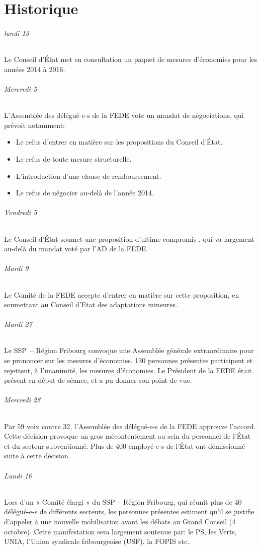 
\chapter{Historique}%
\subparagraph{lundi 13}%
Le Conseil d'État met en consultation un paquet de mesures d'économies pour les années 2014 à 2016.

\subparagraph{Mercredi 5}%
L'Assemblée des délégué-e-s de la FEDE vote un mandat de négociations, qui prévoit notamment:
\begin{itemize}
	\item Le refus d'entrer en matière sur les propositions du Conseil d'État.
	\item Le refus de toute mesure structurelle.
	\item L'introduction d'une clause de remboursement.
	\item Le refus de négocier au-delà de l'année 2014.
\end{itemize}

\subparagraph{Vendredi 5}%
Le Conseil d'État soumet une proposition d'\og ultime compromis \fg, qui va largement au-delà du mandat voté par l'AD de la FEDE.

\subparagraph{Mardi 9}%
Le Comité de la FEDE accepte d'entrer en matière sur cette proposition, en soumettant au Conseil d'Etat des adaptations mineures.

\subparagraph{Mardi 27}%
Le SSP~– Région Fribourg convoque une Assemblée générale extraordinaire pour se prononcer sur les mesures d'économies.
130 personnes présentes participent et rejettent, à l'unanimité, les mesures d'économies.
Le Président de la FEDE était présent en début de séance, et a pu donner son point de vue.

\subparagraph{Mercredi 28}%
Par 59 voix contre 32, l'Assemblée des délégué-e-s de la FEDE approuve l'accord.
Cette décision provoque un gros mécontentement au sein du personnel de l'État et du secteur subventionné.
Plus de 400 employé-e-s de l'État ont démissionné suite à cette décision.

\subparagraph{Lundi 16}%
Lors d'un « Comité élargi » du SSP – Région Fribourg, qui
réunit plus de 40 délégué-e-s de différents secteurs, les personnes présentes estiment
qu'il se justifie d'appeler à une nouvelle mobilisation avant les débats au Grand Conseil (4
octobre). Cette manifestation sera largement soutenue par: le PS, les Verts,
UNIA, l'Union syndicale fribourgeoise (USF), la FOPIS etc.

